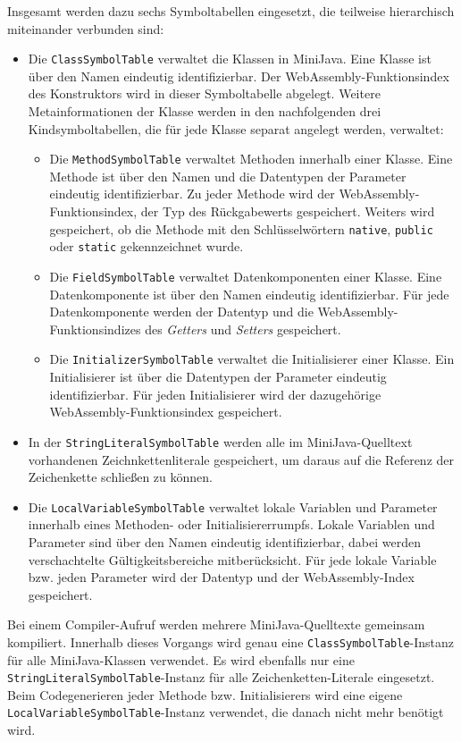 Insgesamt werden dazu sechs Symboltabellen eingesetzt, die teilweise hierarchisch miteinander verbunden sind:
\begin{itemize}
    \item Die \lstinline{ClassSymbolTable} verwaltet die Klassen in MiniJava. Eine Klasse ist über den Namen eindeutig identifizierbar. Der WebAssembly-Funktionsindex des Konstruktors wird in dieser Symboltabelle abgelegt. Weitere Metainformationen der Klasse werden in den nachfolgenden drei Kindsymboltabellen, die für jede Klasse separat angelegt werden, verwaltet:
    \begin{itemize}
        \item Die \lstinline{MethodSymbolTable} verwaltet Methoden innerhalb einer Klasse. Eine Methode ist über den Namen und die Datentypen der Parameter eindeutig identifizierbar. Zu jeder Methode wird der WebAssembly-Funktionsindex, der Typ des Rückgabewerts gespeichert. Weiters wird gespeichert, ob die Methode mit den Schlüsselwörtern \lstinline{native}, \lstinline{public} oder \lstinline{static}  gekennzeichnet wurde.
        \item Die \lstinline{FieldSymbolTable} verwaltet Datenkomponenten einer Klasse. Eine Datenkomponente ist über den Namen eindeutig identifizierbar. Für jede Datenkomponente werden der Datentyp und die WebAssembly-Funktionsindizes des \emph{Getters} und \emph{Setters} gespeichert.
        \item Die \lstinline{InitializerSymbolTable} verwaltet die Initialisierer einer Klasse. Ein Initialisierer ist über die Datentypen der Parameter eindeutig identifizierbar. Für jeden Initialisierer wird der dazugehörige WebAssembly-Funktionsindex gespeichert.
    \end{itemize}
    \item In der \lstinline{StringLiteralSymbolTable} werden alle im MiniJava-Quelltext vorhandenen Zeichnkettenliterale gespeichert, um daraus auf die Referenz der Zeichenkette schließen zu können.
    \item Die \lstinline{LocalVariableSymbolTable} verwaltet lokale Variablen und Parameter innerhalb eines Methoden- oder Initialisiererrumpfs. Lokale Variablen und Parameter sind über den Namen eindeutig identifizierbar, dabei werden verschachtelte Gültigkeitsbereiche mitberücksicht. Für jede lokale Variable bzw. jeden Parameter wird der Datentyp und der WebAssembly-Index gespeichert.
\end{itemize}

Bei einem Compiler-Aufruf werden mehrere MiniJava-Quelltexte gemeinsam kompiliert. Innerhalb dieses Vorgangs wird genau eine \lstinline{ClassSymbolTable}-Instanz für alle MiniJava-Klassen verwendet. Es wird ebenfalls nur eine \lstinline{StringLiteralSymbolTable}-Instanz für alle Zeichenketten-Literale eingesetzt. Beim Codegenerieren jeder Methode bzw. Initialisierers wird eine eigene \lstinline{LocalVariableSymbolTable}-Instanz verwendet, die danach nicht mehr benötigt wird.

